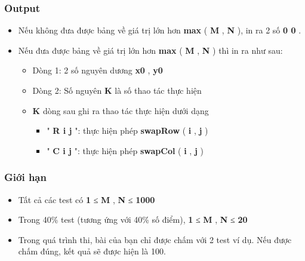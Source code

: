 \subsubsection{   Output  }
\begin{itemize}
	\item     Nếu không đưa được bảng về giá trị lớn hơn    \textbf{     max    }    (    \textbf{     M    }    ,    \textbf{     N    }    ), in ra 2 số    \textbf{     0 0    }    .   
	\item     Nếu đưa được bảng về giá trị lớn hơn    \textbf{     max    }    (    \textbf{     M    }    ,    \textbf{     N    }    ) thì in ra như sau:    
\begin{itemize}
	\item       Dòng 1: 2 số nguyên dương      \textbf{       x0      }      ,      \textbf{       y0      }
	\item       Dòng 2: Số nguyên      \textbf{       K      }      là số thao tác thực hiện     
	\item \textbf{       K      }      dòng sau ghi ra thao tác thực hiện dưới dạng      
\begin{itemize}
	\item         "        \textbf{         R i j        }        ": thực hiện phép        \textbf{         swapRow        }        (        \textbf{         i        }        ,        \textbf{         j        }        )       
	\item         "        \textbf{         C i j        }        ": thực hiện phép        \textbf{         swapCol        }        (        \textbf{         i        }        ,        \textbf{         j        }        )       
\end{itemize}
\end{itemize}
\end{itemize}



\subsubsection{   Giới hạn  }
\begin{itemize}
	\item     Tất cả các test có    \textbf{     1    }    ≤    \textbf{     M    }    ,    \textbf{     N    }    ≤    \textbf{     1000    }
	\item     Trong 40\% test (tương ứng với 40\% số điểm),    \textbf{     1    }    ≤    \textbf{     M    }    ,    \textbf{     N    }    ≤    \textbf{     20    }
	\item      Trong quá trình thi, bài của bạn chỉ được chấm với 2 test ví dụ. Nếu được chấm đúng, kết quả sẽ được hiện là 100.    
\end{itemize}

